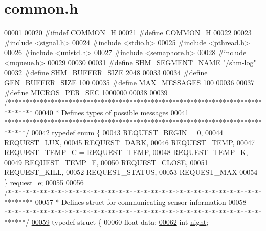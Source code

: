 \hypertarget{common_8h_source}{}\section{common.\+h}
\label{common_8h_source}

\begin{DoxyCode}
00001 
00020 \textcolor{preprocessor}{#ifndef COMMON\_H}
00021 \textcolor{preprocessor}{#define COMMON\_H}
00022 
00023 \textcolor{preprocessor}{#include <signal.h>}
00024 \textcolor{preprocessor}{#include <stdio.h>}
00025 \textcolor{preprocessor}{#include <pthread.h>}
00026 \textcolor{preprocessor}{#include <unistd.h>}
00027 \textcolor{preprocessor}{#include <semaphore.h>}
00028 \textcolor{preprocessor}{#include <mqueue.h>}
00029 
00030 
00031 \textcolor{preprocessor}{#define SHM\_SEGMENT\_NAME "/shm-log"}
00032 \textcolor{preprocessor}{#define SHM\_BUFFER\_SIZE 2048}
00033 
00034 \textcolor{preprocessor}{#define GEN\_BUFFER\_SIZE 100}
00035 \textcolor{preprocessor}{#define MAX\_MESSAGES 100}
00036 
00037 \textcolor{preprocessor}{#define MICROS\_PER\_SEC  1000000}
00038 
00039 \textcolor{comment}{/*******************************************************************************}
00040 \textcolor{comment}{ *  Defines types of possible messages}
00041 \textcolor{comment}{ ******************************************************************************/}
00042 \textcolor{keyword}{typedef} \textcolor{keyword}{enum} \{
00043    REQUEST\_BEGIN = 0,
00044    REQUEST\_LUX,
00045    REQUEST\_DARK,
00046    REQUEST\_TEMP,
00047    REQUEST\_TEMP\_C = REQUEST\_TEMP,
00048    REQUEST\_TEMP\_K,
00049    REQUEST\_TEMP\_F,
00050    REQUEST\_CLOSE,
00051    REQUEST\_KILL,
00052    REQUEST\_STATUS,
00053    REQUEST\_MAX
00054 \} request\_e;
00055 
00056 \textcolor{comment}{/*******************************************************************************}
00057 \textcolor{comment}{ *  Defines struct for communicating sensor information}
00058 \textcolor{comment}{ ******************************************************************************/}
\hyperlink{structsensor__data__t}{00059} \textcolor{keyword}{typedef} \textcolor{keyword}{struct }\{
00060    \textcolor{keywordtype}{float} data;    
\hyperlink{structsensor__data__t_a237c02f9c5f1662b2c0736c795736ca2}{00062}    \textcolor{keywordtype}{int}   \hyperlink{structsensor__data__t_a237c02f9c5f1662b2c0736c795736ca2}{night};   

\end{DoxyCode}
